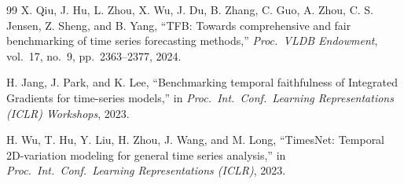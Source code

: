 \documentclass[conference,a4paper]{IEEEtran}
\begin{document}
\begin{thebibliography}{99}
X. Qiu, J. Hu, L. Zhou, X. Wu, J. Du, B. Zhang, C. Guo, A. Zhou, C. S. Jensen,
Z. Sheng, and B. Yang,
``TFB: Towards comprehensive and fair benchmarking of time series forecasting methods,''
\textit{Proc.\ VLDB Endowment}, vol.~17, no.~9, pp.~2363--2377, 2024.

H. Jang, J. Park, and K. Lee,
``Benchmarking temporal faithfulness of Integrated Gradients for time-series models,''
in \textit{Proc.\ Int.\ Conf.\ Learning Representations (ICLR) Workshops}, 2023.

H. Wu, T. Hu, Y. Liu, H. Zhou, J. Wang, and M. Long,
``TimesNet: Temporal 2D-variation modeling for general time series analysis,''
in \textit{Proc.\ Int.\ Conf.\ Learning Representations (ICLR)}, 2023.

\end{thebibliography}
\end{document}
